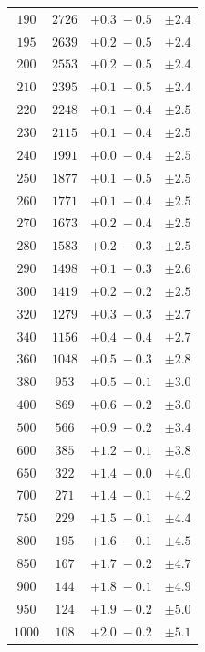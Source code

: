 \begin{table}
\begin{tabular}{cccc}
$190 $&$ 2726   $&$ +0.3  \; -\!0.5  $&$ \pm 2.4 $ \\
$195 $&$ 2639   $&$ +0.2  \; -\!0.5  $&$ \pm 2.4 $ \\
$200 $&$ 2553   $&$ +0.2  \; -\!0.5  $&$ \pm 2.4 $ \\
$210 $&$ 2395   $&$ +0.1  \; -\!0.5  $&$ \pm 2.4 $ \\
$220 $&$ 2248   $&$ +0.1  \; -\!0.4  $&$ \pm 2.5 $ \\
$230 $&$ 2115   $&$ +0.1  \; -\!0.4  $&$ \pm 2.5 $ \\
$240 $&$ 1991   $&$ +0.0  \; -\!0.4  $&$ \pm 2.5 $ \\
$250 $&$ 1877   $&$ +0.1  \; -\!0.5  $&$ \pm 2.5 $ \\
$260 $&$ 1771   $&$ +0.1  \; -\!0.4  $&$ \pm 2.5 $ \\
$270 $&$ 1673   $&$ +0.2  \; -\!0.4  $&$ \pm 2.5 $ \\
$280 $&$ 1583   $&$ +0.2  \; -\!0.3  $&$ \pm 2.5 $ \\
$290 $&$ 1498   $&$ +0.1  \; -\!0.3  $&$ \pm 2.6 $ \\
$300 $&$ 1419   $&$ +0.2  \; -\!0.2  $&$ \pm 2.5 $ \\
$320 $&$ 1279   $&$ +0.3  \; -\!0.3  $&$ \pm 2.7 $ \\
$340 $&$ 1156   $&$ +0.4  \; -\!0.4  $&$ \pm 2.7 $ \\
$360 $&$ 1048   $&$ +0.5  \; -\!0.3  $&$ \pm 2.8 $ \\
$380 $&$  953   $&$ +0.5  \; -\!0.1  $&$ \pm 3.0 $ \\
$400 $&$  869   $&$ +0.6  \; -\!0.2  $&$ \pm 3.0 $ \\
$500 $&$  566   $&$ +0.9  \; -\!0.2  $&$ \pm 3.4 $ \\
$600 $&$  385   $&$ +1.2  \; -\!0.1  $&$ \pm 3.8 $ \\
$650 $&$  322   $&$ +1.4  \; -\!0.0  $&$ \pm 4.0 $ \\
$700 $&$  271   $&$ +1.4  \; -\!0.1  $&$ \pm 4.2 $ \\
$750 $&$  229   $&$ +1.5  \; -\!0.1  $&$ \pm 4.4 $ \\
$800 $&$  195   $&$ +1.6  \; -\!0.1  $&$ \pm 4.5 $ \\
$850 $&$  167   $&$ +1.7  \; -\!0.2  $&$ \pm 4.7 $ \\
$900 $&$  144   $&$ +1.8  \; -\!0.1  $&$ \pm 4.9 $ \\
$950 $&$  124   $&$ +1.9  \; -\!0.2  $&$ \pm 5.0 $ \\
$1000$&$  108   $&$ +2.0  \; -\!0.2  $&$ \pm 5.1 $ \\
\hline
\end{tabular} 
\label{tab:noEWnoSch14TeV}
\end{table}


